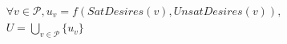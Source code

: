 \begin{definition}[Utility]
  \label{utility}
  \begin{gather*}
    \forall v \in \mathcal{P}, u_v = f\left(SatDesires\left(v\right),
    UnsatDesires\left(v\right)\right), \\
    U = \bigcup\limits_{v \in \mathcal{P}}\{u_v\}
  \end{gather*}
\end{definition}
